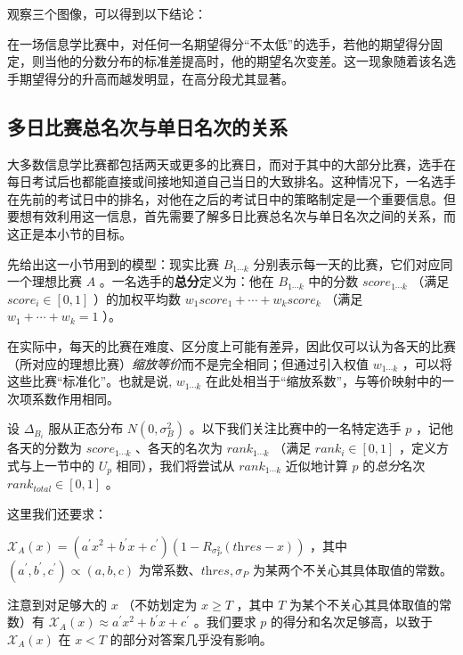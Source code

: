             观察三个图像，可以得到以下结论：

            \begin{tcolorbox}[colback=white,colframe=black,boxrule=0.5pt,arc=0pt]
                在一场信息学比赛中，对任何一名期望得分“不太低”的选手，若他的期望得分固定，则当他的分数分布的标准差提高时，他的期望名次变差。这一现象随着该名选手期望得分的升高而越发明显，在高分段尤其显著。
            \end{tcolorbox}

    \subsection{多日比赛总名次与单日名次的关系}\label{sec:relationBetweenEachDayAndTotal}

        大多数信息学比赛都包括两天或更多的比赛日，而对于其中的大部分比赛，选手在每日考试后也都能直接或间接地知道自己当日的大致排名。这种情况下，一名选手在先前的考试日中的排名，对他在之后的考试日中的策略制定是一个重要信息。但要想有效利用这一信息，首先需要了解多日比赛总名次与单日名次之间的关系，而这正是本小节的目标。

        \vspace{1.5ex}

        先给出这一小节用到的模型：现实比赛 $B_{1\cdots k}$ 分别表示每一天的比赛，它们对应同一个理想比赛 $A$ 。一名选手的\textbf{总分}定义为：他在 $B_{1\cdots k}$ 中的分数 $\textit{score}_{1\cdots k}$ （满足 $\textit{score}_i\in[0,1]$ ）的加权平均数 $w_1\textit{score}_1+\cdots+w_k\textit{score}_k$ （满足 $w_1+\cdots+w_k=1$ ）。

        在实际中，每天的比赛在难度、区分度上可能有差异，因此仅可以认为各天的比赛（所对应的理想比赛）\emph{缩放等价}而不是完全相同；但通过引入权值 $w_{1\cdots k}$ ，可以将这些比赛“标准化”。也就是说, $w_{1\cdots k}$ 在此处相当于“缩放系数”，与等价映射中的一次项系数作用相同。

        设 $\Delta_{B_i}$ 服从正态分布 $N(0,\sigma_B^2)$ 。以下我们关注比赛中的一名特定选手 $p$ ，记他各天的分数为 $\textit{score}_{1\cdots k}$ 、各天的名次为 $\textit{rank}_{1\cdots k}$ （满足 $\textit{rank}_i\in [0,1]$ ，定义方式与上一节中的 $U_p$ 相同），我们将尝试从 $\textit{rank}_{1\cdots k}$ 近似地计算 $p$ 的\emph{总分}名次 $\textit{rank}_{\textit{total}}\in [0,1]$ 。
        
        这里我们还要求：
        \begin{asparaitem}
            \item $\mathcal{X}_A(x)=\left(a^\prime x^2+b^\prime x+c^\prime\right)\left(1-R_{\sigma_P^2}(\textit{thres}-x)\right)$ ，其中 $(a^\prime,b^\prime,c^\prime)\propto (a,b,c)$ 为常系数、$\textit{thres},\sigma_P$ 为某两个不关心其具体取值的常数。
            \item 注意到对足够大的 $x$ （不妨划定为 $x\geq T$ ，其中 $T$ 为某个不关心其具体取值的常数）有 $\mathcal{X}_A(x)\approx a^\prime x^2+b^\prime x+c^\prime$ 。我们要求 $p$ 的得分和名次足够高，以致于 $\mathcal{X}_A(x)$ 在 $x<T$ 的部分对答案几乎没有影响。
        \end{asparaitem}


